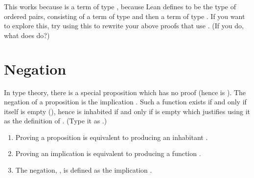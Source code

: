 \documentclass[letterpaper,10pt,english]{sphinxmanual}
\begin{document}
\sphinxAtStartPar
This works because  is a term of type , because Lean defines  to be the type of ordered pairs, consisting of a term of type  and then a term of type .
If you want to explore this, try using this to rewrite your above proofs that use .
(If you do, what does  do?)


\section{Negation}
\label{\detokenize{day1:negation}}
\sphinxAtStartPar
In type theory, there is a special proposition  which has no proof (hence is ).
The negation of a proposition  is the implication .
Such a function exists if and only if  itself is empty (), hence  is inhabited if and only if  is empty which justifies using it as the definition of .
(Type  it as .)
\begin{description}
\begin{enumerate}
%
\item {} 
\sphinxAtStartPar
Proving a proposition  is equivalent to producing an inhabitant .

\item {} 
\sphinxAtStartPar
Proving an implication  is equivalent to producing a function .

\item {} 
\sphinxAtStartPar
The negation, , is defined as the implication .

\end{enumerate}

\end{description}
\end{document}
